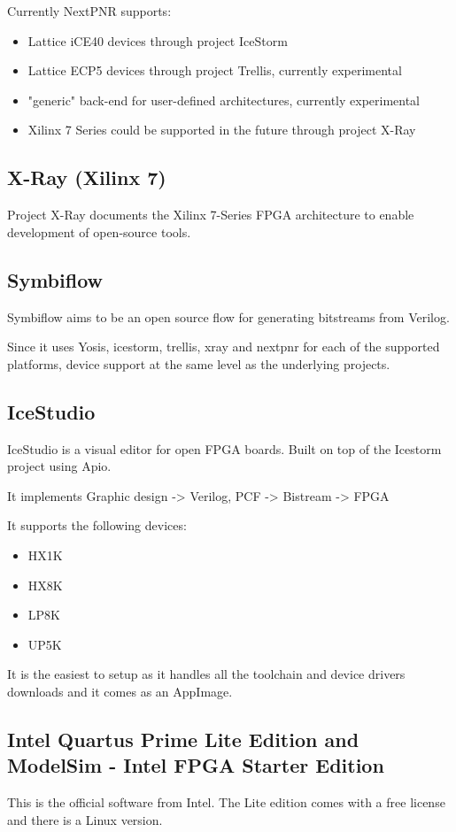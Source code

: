 Currently NextPNR supports:
\begin{itemize}
\item Lattice iCE40 devices through project IceStorm
\item Lattice ECP5 devices through project Trellis, currently experimental
\item "generic" back-end for user-defined architectures, currently experimental
\item Xilinx 7 Series could be supported in the future through project X-Ray 
\end{itemize}

\subsection{X-Ray (Xilinx 7)}
Project X-Ray documents the Xilinx 7-Series FPGA architecture to enable development of open-source tools.



\subsection{Symbiflow}
Symbiflow aims to be an open source flow for generating bitstreams from Verilog. 

Since it uses Yosis, icestorm, trellis, xray and nextpnr for each of the supported platforms, device support at the same level as the underlying projects.


\subsection{IceStudio}
IceStudio is a visual editor for open FPGA boards. Built on top of the Icestorm project using Apio.

It implements Graphic design -> Verilog, PCF -> Bistream -> FPGA

It supports the following devices:

\begin{itemize}
\item HX1K
\item HX8K
\item LP8K
\item UP5K
\end{itemize}

It is the easiest to setup as it handles all the toolchain and device drivers downloads and it comes as an AppImage.

\subsection{Intel Quartus Prime Lite Edition and ModelSim - Intel FPGA Starter Edition}
This is the official software from Intel. The Lite edition comes with a free license and there is a Linux version.

